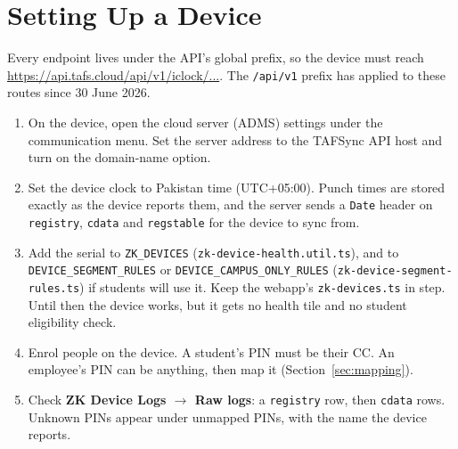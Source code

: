 \documentclass[11pt]{article}
\begin{document}
\section{Setting Up a Device}
Every endpoint lives under the API's global prefix, so the device must reach
\url{https://api.tafs.cloud/api/v1/iclock/...}. The \texttt{/api/v1} prefix has applied to these routes since
30 June 2026.
\begin{enumerate}[nosep]
  \item On the device, open the cloud server (ADMS) settings under the communication menu. Set the server address to
        the TAFSync API host and turn on the domain-name option.
  \item Set the device clock to Pakistan time (UTC+05:00). Punch times are stored exactly as the device reports them,
        and the server sends a \texttt{Date} header on \texttt{registry}, \texttt{cdata} and \texttt{regstable} for the
        device to sync from.
  \item Add the serial to \texttt{ZK\_DEVICES} (\texttt{zk-device-health.util.ts}), and to
        \texttt{DEVICE\_SEGMENT\_RULES} or \texttt{DEVICE\_CAMPUS\_ONLY\_RULES} (\texttt{zk-device-segment-rules.ts}) if
        students will use it. Keep the webapp's \texttt{zk-devices.ts} in step. Until then the device works, but it gets
        no health tile and no student eligibility check.
  \item Enrol people on the device. A student's PIN must be their CC. An employee's PIN can be anything, then map it
        (Section~\ref{sec:mapping}).
  \item Check \textbf{ZK Device Logs $\rightarrow$ Raw logs}: a \texttt{registry} row, then \texttt{cdata} rows. Unknown
        PINs appear under unmapped PINs, with the name the device reports.
\end{enumerate}

\end{document}
